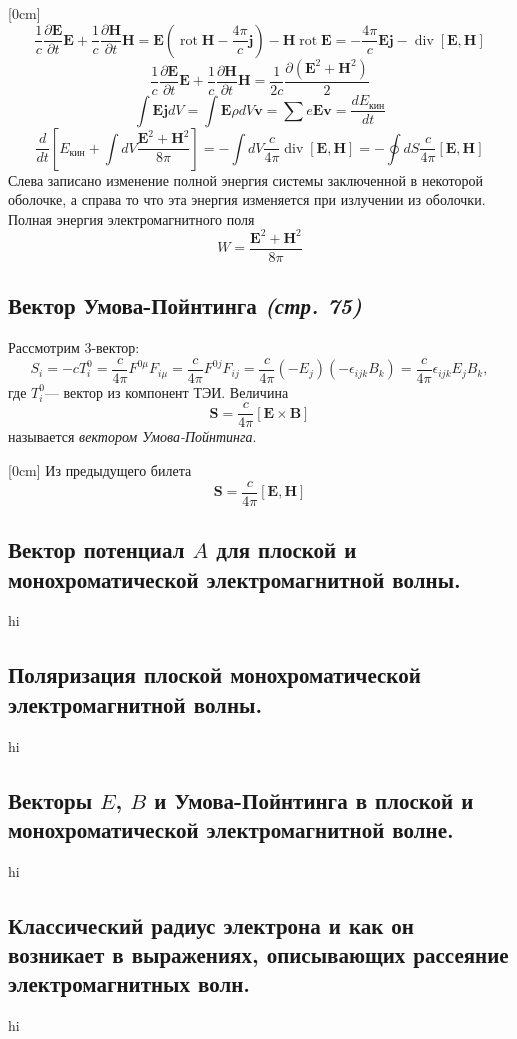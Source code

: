 \documentclass[a4paper,12pt]{article}
\begin{document}
[0cm]
\[
\frac{1}{c}\frac{\partial \mathbf{E}}{\partial t}\mathbf{E}+\frac{1}{c}\frac{\partial \mathbf{H}}{\partial t}\mathbf{H}=\mathbf{E}\left(\operatorname{rot}\mathbf{H}-\frac{4\pi}{c}\mathbf{j}\right)-\mathbf{H}\operatorname{rot}\mathbf{E}=-\frac{4\pi}{c}\mathbf{E}\mathbf{j}-\operatorname{div}{[\mathbf{E},\mathbf{H}]}
\]
\[
\frac{1}{c}\frac{\partial \mathbf{E}}{\partial t}\mathbf{E}+\frac{1}{c}\frac{\partial \mathbf{H}}{\partial t}\mathbf{H}=\frac{1}{2c}\frac{\partial (\mathbf{E}^2+\mathbf{H}^2)}{2}
\]
\[\int \mathbf{E}\mathbf{j} dV=\int \mathbf{E}\rho dV \mathbf{v}=\sum e\mathbf{E}\mathbf{v}=\frac{dE_{\text{кин}}}{dt}\]
\[\frac{d}{dt}\left[E_{\text{кин}}+\int dV\frac{\mathbf{E}^2+\mathbf{H}^2}{8\pi}\right]=-\int dV\frac{c}{4\pi}\operatorname{div}{[\mathbf{E},\mathbf{H}]}=-\oint dS \frac{c}{4\pi}[\mathbf{E},\mathbf{H}]\]
Слева записано изменение полной энергия системы заключенной в некоторой оболочке, а справа то что эта энергия изменяется при излучении из оболочки. Полная энергия электромагнитного поля 
\[W=\frac{\mathbf{E}^2+\mathbf{H}^2}{8\pi}\]
\subsection{Вектор Умова-Пойнтинга \emph{(стр. 75)}}
Рассмотрим 3-вектор:
\[
S_i=-cT_i^0=\frac{c}{4\pi}F^{0\mu}F_{i\mu}=\frac{c}{4\pi}F^{0j}F_{ij}=
\frac{c}{4\pi}(-E_j)(-\epsilon_{ijk}B_k)=\frac{c}{4\pi}\epsilon_{ijk}E_j B_k
,\]
где $T_i^{0}$--- вектор из компонент ТЭИ.
Величина
\[
\mathbf{S}=\frac{c}{4\pi}\left[ \mathbf{E}\times\mathbf{B} \right] 
\]
называется \emph{вектором Умова-Пойнтинга}.

[0cm]
Из предыдущего билета \[\mathbf{S}=\frac{c}{4\pi}[\mathbf{E},\mathbf{H}]\]
\subsection{Вектор потенциал $A$ для плоской и монохроматической
электромагнитной
волны.}
hi
\subsection{Поляризация плоской монохроматической электромагнитной волны.}
hi
\subsection{Векторы $E$, $B$ и Умова-Пойнтинга в плоской и монохроматической
электромагнитной волне.}
hi
\subsection{Классический радиус электрона и как он возникает в выражениях,
описывающих рассеяние электромагнитных волн.}
hi
\end{document}
